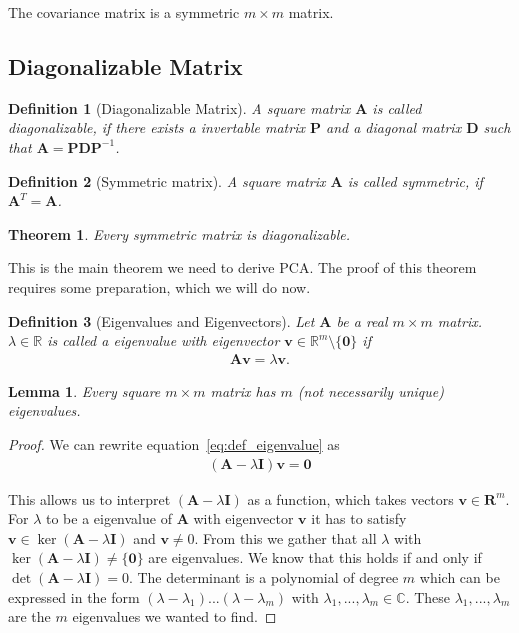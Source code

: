\documentclass[a4paper]{IEEEtran}
\newtheorem{definition}{Definition}
\newtheorem{lemma}{Lemma}
\newtheorem{theorem}{Theorem}
\begin{document}
The covariance matrix is a symmetric $m\times m$ matrix.

\subsection{Diagonalizable Matrix}

\begin{definition}[Diagonalizable Matrix]
	A square matrix $\mathbf{A}$ is called \textit{diagonalizable}, if there exists a invertable matrix $\mathbf{P}$ and a diagonal matrix $\mathbf{D}$ such that $\mathbf{A} = \mathbf{P}\mathbf{D}\mathbf{P}^{-1}$.
\end{definition}

\begin{definition}[Symmetric matrix]
	A square matrix $\mathbf{A}$ is called \textit{symmetric}, if $\mathbf{A}^T = \mathbf{A}$.
\end{definition}

\begin{theorem}
	\label{th:symmetric_matrix_diagonalizable}
	Every symmetric matrix is diagonalizable.
\end{theorem}

This is the main theorem we need to derive PCA. The proof of this theorem requires some preparation, which we will do now.

\begin{definition}[Eigenvalues and Eigenvectors]
	Let $\mathbf{A}$ be a real $m\times m$ matrix. $\lambda \in \mathbb{R}$ is called a \textit{eigenvalue} with \textit{eigenvector} $\mathbf{v} \in \mathbb{R}^m\setminus\{\mathbf{0}\}$ if
	\begin{align}
		\label{eq:def_eigenvalue}
		\mathbf{Av} = \lambda \mathbf{v}.
	\end{align}
\end{definition}

\begin{lemma}
	\label{lem:existence_eigenvalues}
	Every square $m\times m$ matrix has $m$ (not necessarily unique) eigenvalues.
\end{lemma}

\begin{proof}
	We can rewrite equation~\ref{eq:def_eigenvalue} as
	\begin{align*}
		(\mathbf{A} - \lambda \mathbf{I})\mathbf{v} = \mathbf{0}
	\end{align*}
	
	This allows us to interpret $(\mathbf{A}-\lambda \mathbf{I})$ as a function, which takes vectors $\mathbf{v} \in \mathbf{R}^m$. For $\lambda$ to be a eigenvalue of $\mathbf{A}$ with eigenvector $\mathbf{v}$ it has to satisfy $\mathbf{v} \in \ker(\mathbf{A} - \lambda \mathbf{I})$ and $\mathbf{v} \neq 0$. From this we gather that all $\lambda$ with $\ker(\mathbf{A} - \lambda \mathbf{I}) \neq \{\mathbf{0}\}$ are eigenvalues. We know that this holds if and only if $\det(\mathbf{A} - \lambda \mathbf{I}) = 0$. The determinant is a polynomial of degree $m$ which can be expressed in the form $(\lambda - \lambda_1)...(\lambda - \lambda_m)$ with $\lambda_1, ..., \lambda_m \in \mathbb{C}$. These $\lambda_1, ..., \lambda_m$ are the $m$ eigenvalues we wanted to find.
\end{proof}
\end{document}
